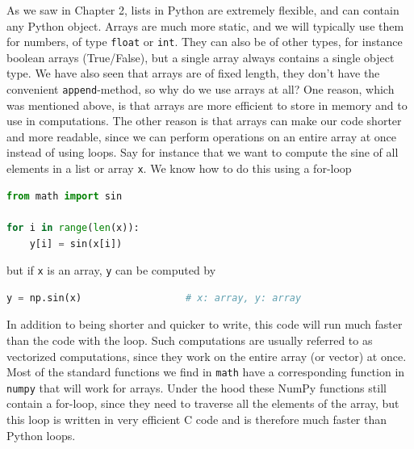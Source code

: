 \documentclass[graybox,envcountchap,sectrefs,final]{svmonodo}
\begin{document}
As we saw in Chapter 2, lists in Python are extremely flexible, and can contain any Python object. Arrays are much
more static, and we will typically use them for numbers, of type \texttt{float} or \texttt{int}. They can also be of other types,
for instance boolean arrays (True/False), but a single array always contains a single object type. We have also
seen that arrays are of fixed length, they don't have the convenient \texttt{append}-method, so why do we use arrays at all?
One reason, which was mentioned above, is that arrays are more efficient to store in memory and to
use in computations. The other reason is that arrays can make our code shorter and more readable, since
we can perform operations on an entire array at once instead of using loops. Say for instance that we want to
compute the sine of all elements in a list or array \texttt{x}. We know how to do this using a for-loop
\begin{lstlisting}[language=Python,style=blue1]
from math import sin

for i in range(len(x)):
    y[i] = sin(x[i])
\end{lstlisting}
but if \texttt{x} is an array, \texttt{y} can be computed by

\begin{lstlisting}[language=Python,style=blue1]
y = np.sin(x)                  # x: array, y: array
\end{lstlisting}
In addition to being shorter and quicker to write, this code will run much faster than the code with the loop.
Such computations are usually referred to as vectorized computations, since they work on the entire
array (or vector) at once. Most of the standard functions we find in \texttt{math} have a corresponding function in
\texttt{numpy} that will work for arrays. Under the hood these NumPy functions still contain a for-loop, since they need to
traverse all the elements of the array, but this loop is written in very efficient C code and is therefore much
faster than Python loops.
\end{document}
